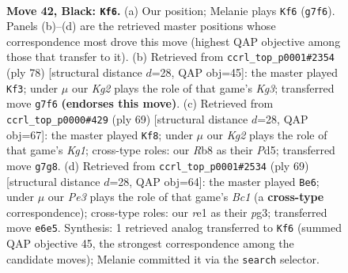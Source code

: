 \documentclass[11pt]{article}
\begin{document}
\clearpage

\begin{figure}[p]\centering
\begin{subfigure}{0.46\textwidth}\centering
\resizebox{\linewidth}{!}{%
\newchessgame
\chessboard[
  setfen={1r6/1p3pk1/pR2p3/8/P3PK2/5P1P/7P/4R3 b - - 14 42},
  showmover=false,
  pgfstyle=straightmove, color=movearrow, markmove={g7-f6}
]}
\caption{}
\end{subfigure}\hfill
\begin{subfigure}{0.46\textwidth}\centering
\resizebox{\linewidth}{!}{%
\newchessgame
\chessboard[
  setfen={6k1/5pp1/7p/3pPP2/1r4P1/1P4K1/8/1R6 w - - 2 40},
  showmover=false,
  pgfstyle=straightmove, color=movearrow, markmove={g3-f3}
]}
\caption{}
\end{subfigure}
\\[4pt]
\begin{subfigure}{0.46\textwidth}\centering
\resizebox{\linewidth}{!}{%
\newchessgame
\chessboard[
  setfen={6k1/4R1p1/4p2p/3p3P/p7/P5P1/1P3PK1/4r3 b - - 0 35},
  showmover=false,
  pgfstyle=straightmove, color=movearrow, markmove={g8-f8}
]}
\caption{}
\end{subfigure}\hfill
\begin{subfigure}{0.46\textwidth}\centering
\resizebox{\linewidth}{!}{%
\newchessgame
\chessboard[
  setfen={2b2k2/5p2/rpp3p1/8/4PP2/3PK1P1/pR6/R7 b - - 1 35},
  showmover=false,
  pgfstyle=straightmove, color=movearrow, markmove={c8-e6}
]}
\caption{}
\end{subfigure}
\caption{\textbf{Move 42, Black: \texttt{Kf6}.} (a) Our position; Melanie plays \texttt{Kf6} (\texttt{g7f6}). Panels (b)--(d) are the retrieved master positions whose correspondence most drove this move (highest QAP objective among those that transfer to it). (b) Retrieved from \texttt{ccrl\_top\_p0001\#2354} (ply 78) [structural distance $d$=28, QAP obj=45]: the master played \texttt{Kf3}; under $\mu$ our \emph{Kg2} plays the role of that game's \emph{Kg3}; transferred move \texttt{g7f6} \textbf{(endorses this move)}. (c) Retrieved from \texttt{ccrl\_top\_p0000\#429} (ply 69) [structural distance $d$=28, QAP obj=67]: the master played \texttt{Kf8}; under $\mu$ our \emph{Kg2} plays the role of that game's \emph{Kg1}; cross-type roles: our \emph{R}b8 as their \emph{P}d5; transferred move \texttt{g7g8}. (d) Retrieved from \texttt{ccrl\_top\_p0001\#2534} (ply 69) [structural distance $d$=28, QAP obj=64]: the master played \texttt{Be6}; under $\mu$ our \emph{Pe3} plays the role of that game's \emph{Bc1} (a \textbf{cross-type} correspondence); cross-type roles: our \emph{r}e1 as their \emph{p}g3; transferred move \texttt{e6e5}. Synthesis: 1 retrieved analog transferred to \texttt{Kf6} (summed QAP objective 45, the strongest correspondence among the candidate moves); Melanie committed it via the \texttt{search} selector.}
\label{fig:thought-m83}
\end{figure}
\end{document}
